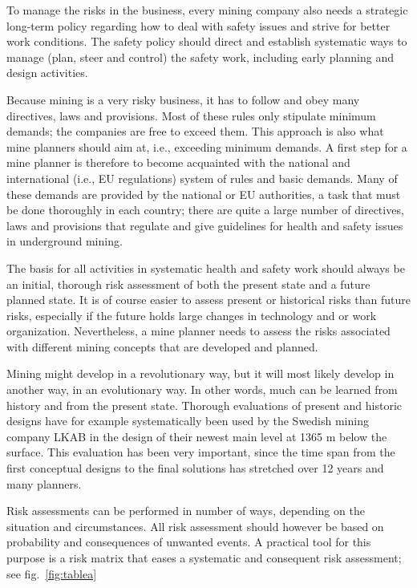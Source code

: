 \documentclass[
  12pt,
]{scrbook}
\begin{document}
To manage the risks in the business, every mining company also needs a strategic long-term policy regarding how to deal with safety issues and strive for better work conditions. The safety policy should direct and establish systematic ways to manage (plan, steer and control) the safety work, including early planning and design activities.

Because mining is a very risky business, it has to follow and obey many directives, laws and provisions. Most of these rules only stipulate minimum demands; the companies are free to exceed them. This approach is also what mine planners should aim at, i.e., exceeding minimum demands. A first step for a mine planner is therefore to become acquainted with the national and international (i.e., EU regulations) system of rules and basic demands. Many of these demands are provided by the national or EU authorities, a task that must be done thoroughly in each country; there are quite a large number of directives, laws and provisions that regulate and give guidelines for health and safety issues in underground mining.

The basis for all activities in systematic health and safety work should always be an initial, thorough risk assessment of both the present state and a future planned state. It is of course easier to assess present or historical risks than future risks, especially if the future holds large changes in technology and or work organization. Nevertheless, a mine planner needs to assess the risks associated with different mining concepts that are developed and planned.

Mining might develop in a revolutionary way, but it will most likely develop in another way, in an evolutionary way. In other words, much can be learned from history and from the present state. Thorough evaluations of present and historic designs have for example systematically been used by the Swedish mining company LKAB in the design of their newest main level at 1365 m below the surface. This evaluation has been very important, since the time span from the first conceptual designs to the final solutions has stretched over 12 years and many planners.

Risk assessments can be performed in number of ways, depending on the situation and circumstances. All risk assessment should however be based on probability and consequences of unwanted events. A practical tool for this purpose is a risk matrix that eases a systematic and consequent risk assessment; see fig.~\ref{fig:tablea}
\end{document}
